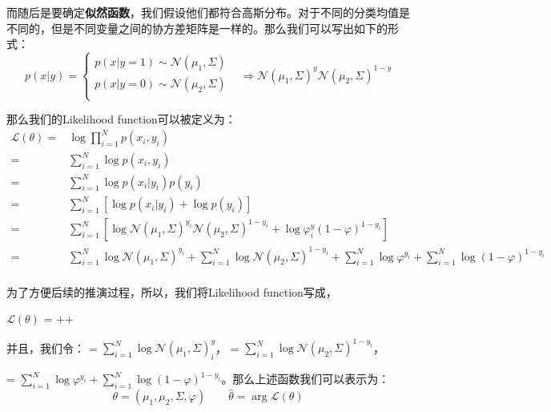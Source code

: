 \documentclass[a4paper]{article}
\begin{document}
而随后是要确定\textbf{似然函数}，我们假设他们都符合高斯分布。对于不同的分类均值是不同的，但是不同变量之间的协方差矩阵是一样的。那么我们可以写出如下的形式：
\begin{equation}
    p(x|y)=
    \left\{
        \begin{array}{ll}
            p(x|y=1)\sim \mathcal{N}(\mu_1, \Sigma) & \\
            p(x|y=0)\sim \mathcal{N}(\mu_2, \Sigma) & \\
        \end{array}
    \right.
    \Rightarrow
    \mathcal{N}(\mu_1, \Sigma)^y\mathcal{N}(\mu_2, \Sigma)^{1-y}
\end{equation}

那么我们的Likelihood function可以被定义为：
\begin{equation}
    \begin{split}
        \mathcal{L}(\theta) = & \log\prod_{i=1}^Np(x_i,y_i) \\
         = & \sum_{i=1}^N\log p(x_i,y_i) \\
         = & \sum_{i=1}^N\log p(x_i|y_i)p(y_i) \\
         = & \sum_{i=1}^N\left[ \log p(x_i|y_i)+ \log p(y_i) \right]\\
         = & \sum_{i=1}^N\left[ \log \mathcal{N}(\mu_1, \Sigma)^{y_i}\mathcal{N}(\mu_2, \Sigma)^{1-y_i}+ \log \varphi^y_i(1-\varphi)^{1-y_i} \right]\\
         = & \sum_{i=1}^N \log \mathcal{N}(\mu_1, \Sigma)^{y_i} + \sum_{i=1}^N \log \mathcal{N}(\mu_2, \Sigma)^{1-y_i}+ \sum_{i=1}^N \log \varphi^{y_i} + \sum_{i=1}^N \log (1-\varphi)^{1-y_i} \\
    \end{split}
\end{equation}

为了方便后续的推演过程，所以，我们将Likelihood function写成，
\begin{center}
    $\mathcal{L}(\theta)$ = ++
\end{center}

并且，我们令：
 = $\sum_{i=1}^N \log \mathcal{N}(\mu_1, \Sigma)^y_i$， = $\sum_{i=1}^N \log \mathcal{N}(\mu_2, \Sigma)^{1-y_i}$，

 = $\sum_{i=1}^N \log \varphi^{y_i} + \sum_{i=1}^N \log (1-\varphi)^{1-y_i}$。那么上述函数我们可以表示为：
\begin{equation}
    \theta = (\mu_1,\mu_2,\Sigma,\varphi) \qquad \hat{\theta} = \mathop{\arg\max_{\theta}} \mathcal{L}(\theta)
\end{equation}
\end{document}
